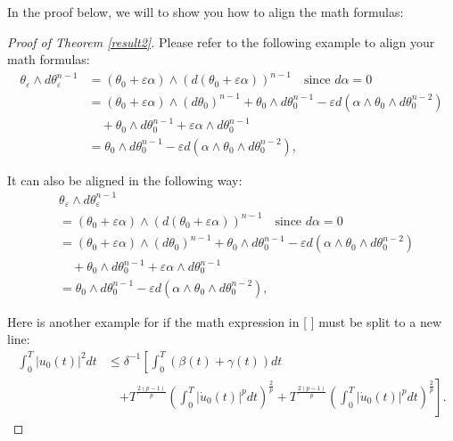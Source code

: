 \documentclass{aims} %
\theoremstyle{definition}
\newcommand{\ep}{\varepsilon}
\newcommand{\eps}[1]{{#1}_{\varepsilon}}
\begin{document}
In the proof below, we will to show you how to align the math formulas:
\begin{proof}[Proof of Theorem \ref{result2}]
    Please refer to the following example to align your math formulas:
\begin{equation}\label{Eqn2}
  \begin{split}
    \eps{\theta} \wedge d\eps{\theta}^{n-1}
    & = (\theta_0 + \ep \alpha) \wedge (d(\theta_0 + \ep \alpha))^{n-1}
      \quad \text{since } d\alpha = 0 \\
    & = (\theta_0 + \ep \alpha) \wedge (d\theta_0)^{n-1} + \theta_0 \wedge d\theta_0^{n-1}
      - \ep d(\alpha \wedge \theta_0 \wedge d\theta_0^{n-2}) \\
    & \quad  + \theta_0 \wedge d\theta_0^{n-1} + \ep \alpha \wedge d\theta_0^{n-1}  \\
    & = \theta_0 \wedge d\theta_0^{n-1}
      - \ep d(\alpha \wedge \theta_0 \wedge d\theta_0^{n-2}),
  \end{split}
\end{equation}

It can also be aligned in the following way:
\begin{equation}\label{Eqn3}
  \begin{split}
    & \eps{\theta} \wedge d\eps{\theta}^{n-1} \\
    & = (\theta_0 + \ep \alpha) \wedge (d(\theta_0 + \ep \alpha))^{n-1}
      \quad \text{since } d\alpha = 0 \\
    & = (\theta_0 + \ep \alpha) \wedge (d\theta_0)^{n-1} + \theta_0 \wedge d\theta_0^{n-1}
      - \ep d(\alpha \wedge \theta_0 \wedge d\theta_0^{n-2}) \\
    & \quad + \theta_0 \wedge d\theta_0^{n-1} + \ep \alpha \wedge d\theta_0^{n-1} \\
    & = \theta_0 \wedge d\theta_0^{n-1}
      - \ep d(\alpha \wedge \theta_0 \wedge d\theta_0^{n-2}),
  \end{split}
\end{equation}

Here is another example for if the math expression in [ ] must be split to a new line:
\begin{equation}\label{Eqn4}
  \begin{split}
    \int_0^T |u_0(t)|^2dt
    & \leq \delta^{-1} \left[\int_0^T (\beta(t)+\gamma(t)) dt \right.\\
    & \quad \left.+ T^{\frac{2(p-1)}{p}}
      \left(\int_0^T |\dot{u}_0(t)|^p dt\right)^{\frac{2}{p}}
      + T^{\frac{2(p-1)}{p}}
      \left(\int_0^T |\dot{u}_0(t)|^p dt\right)^{\frac{2}{p}}\right].
  \end{split}
\end{equation}


\end{proof}
\end{document}
